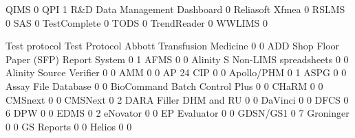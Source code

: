 \documentclass{article}
\begin{document}
\begin{Schunk}
\begin{Soutput}
  QIMS                                                                0
  QPI                                                                 1
  R&D Data Management Dashboard                                       0
  Reliasoft Xfmea                                                     0
  RSLMS                                                               0
  SAS                                                                 0
  TestComplete                                                        0
  TODS                                                                0
  TrendReader                                                         0
  WWLIMS                                                              0
                                          
                                           Test protocol Test Protocol
  Abbott Transfusion Medicine                          0             0
  ADD Shop Floor Paper (SFP) Report System             0             1
  AFMS                                                 0             0
  Alinity S Non-LIMS spreadsheets                      0             0
  Alinity Source Verifier                              0             0
  AMM                                                  0             0
  AP 24 CIP                                            0             0
  Apollo/PHM                                           0             1
  ASPG                                                 0             0
  Assay File Database                                  0             0
  BioCommand Batch Control Plus                        0             0
  CHaRM                                                0             0
  CMSnext                                              0             0
  CMSNext                                              0             2
  DARA Filler DHM and RU                               0             0
  DaVinci                                              0             0
  DFCS                                                 0             6
  DPW                                                  0             0
  EDMS                                                 0             2
  eNovator                                             0             0
  EP Evaluator                                         0             0
  GDSN/GS1                                             0             7
  Groninger                                            0             0
  GS Reports                                           0             0
  Helios                                               0             0

\end{Soutput}
\end{Schunk}
\end{document}
